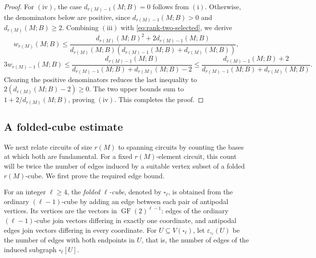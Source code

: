 \documentclass[10pt,a4paper]{article}
\numberwithin{equation}{section}
\DeclareMathOperator{\GF}{GF}
\newcommand{\FF}{\GF(2)}
\newcommand{\wloc}[1]{w_{#1}(M;B)}
\newcommand{\dloc}[1]{d_{#1}(M;B)}
\begin{document}
\begin{proof}
For \(\mathrm{(iv)}\), the case \(\dloc{r(M)-1}=0\)
follows from \(\mathrm{(i)}\). Otherwise, the denominators below
are positive, since \(\dloc{r(M)-1}>0\) and \(\dloc{r(M)}\ge2\).
Combining \(\mathrm{(iii)}\) with \eqref{eq:rank-two-selected}, we derive
\[
 \wloc{r(M)}\le\frac{\dloc{r(M)}^2+2\dloc{r(M)-1}}
 {\dloc{r(M)}(\dloc{r(M)-1}+\dloc{r(M)})},
\]
\[
 3\wloc{r(M)-1}\le\frac{\dloc{r(M)-1}}{\dloc{r(M)-1}+\dloc{r(M)}-2}\le\frac{\dloc{r(M)-1}+2}{\dloc{r(M)-1}+\dloc{r(M)}}.
\]
Clearing the positive denominators reduces the last inequality to
\(2(\dloc{r(M)}-2)\ge0\).
The two upper bounds sum to \(1+2/\dloc{r(M)}\), proving \(\mathrm{(iv)}\). This completes the proof.
\end{proof}

\subsection{A folded-cube estimate}

We next relate circuits of size \(r(M)\) to spanning circuits
by counting the bases at which both are fundamental.
For a fixed \(r(M)\)-element circuit, this count will be twice
the number of edges induced by a suitable vertex subset of a
folded \(r(M)\)-cube. We first prove the required edge bound.

For an integer \(\ell\ge4\), the \emph{folded \(\ell\)-cube}, denoted by \(\square_\ell\), is
obtained from the ordinary \((\ell-1)\)-cube by adding an edge
between each pair of antipodal vertices. Its vertices are the
vectors in \(\FF^{\ell-1}\): edges of the ordinary \((\ell-1)\)-cube join
vectors differing in exactly one coordinate, and antipodal edges join
vectors differing in every coordinate.
For \(U\subseteq V(\square_\ell)\), let
\(\varepsilon_{\square_\ell}(U)\) be the number of edges with
both endpoints in \(U\), that is, the number of edges of
the induced subgraph \(\square_\ell[U]\).
\end{document}
